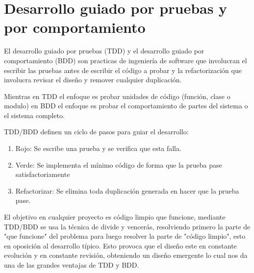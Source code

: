 \section{Desarrollo guiado por pruebas y por comportamiento}
El desarrollo guiado por pruebas (TDD) y el desarrollo guiado por comportamiento
(BDD) son practicas de ingeniería de software que involucran el escribir las pruebas
antes de escribir el código a probar y la refactorización que involucra revisar el
diseño y remover cualquier duplicación.

Mientras en TDD el enfoque es probar unidades de código (función, clase o modulo)
en BDD el enfoque es probar el comportamiento de partes del sistema o el sistema
completo.

TDD/BDD definen un ciclo de pasos para guiar el desarrollo:

\begin{enumerate}
\item Rojo: Se escribe una prueba y se verifica que esta falla.
\item Verde: Se implementa el mínimo código de forma que la prueba pase
  satisfactoriamente
\item Refactorizar: Se elimina toda duplicación generada en hacer que
  la prueba pase.
\end{enumerate}


El objetivo en cualquier proyecto es código limpio que funcione, mediante TDD/BDD
se usa la técnica de divide y vencerás, resolviendo primero la parte de
"que funcione" del problema para luego resolver la parte de "código limpio",
esto en oposición al desarrollo típico. Esto provoca que el diseño este en
constante evolución y en constante revisión, obteniendo un diseño emergente
lo cual nos da una de las grandes ventajas de TDD y BDD.

